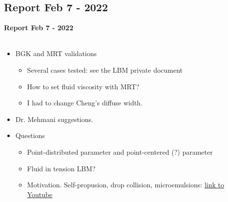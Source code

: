 \documentclass{beamer}
\begin{document}
	\subsection{Report Feb 7 - 2022}
	\label{}
	\justifying
	\begin{frame}
		\textbf{Report Feb 7 - 2022}\\~\\
		\begin{itemize}
			
			\item BGK and MRT validations
			\begin{itemize}
				\item Several cases tested: see the LBM private document
				\item How to set fluid viscosity with MRT?
				\item I had to change Cheng's diffuse width.
			\end{itemize}
			
			\item Dr. Mehmani suggestions.
			\item Questions
			\begin{itemize}
				\item Point-distributed parameter and point-centered (?) parameter
				\item Fluid in tension LBM?
				\item Motivation. Self-propusion, drop collision, microemulsions: \href{https://www.youtube.com/watch?v=arpGntfrg4s}{link to Youtube}
			\end{itemize}
			
		\end{itemize}
	\end{frame}
\end{document}
